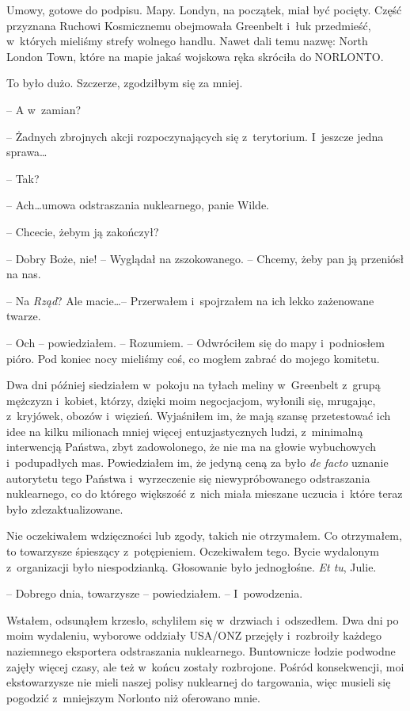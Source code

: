 \documentclass[oneside,polish,11pt,sfheadings]{mwbk}
\begin{document}
Umowy, gotowe do podpisu. Mapy. Londyn, na początek, miał być pocięty.
Część przyznana Ruchowi Kosmicznemu obejmowała Greenbelt i~łuk
przedmieść, w~których mieliśmy strefy wolnego handlu. Nawet dali temu
nazwę: North London Town, które na mapie jakaś wojskowa ręka skróciła do
NORLONTO.

To było dużo. Szczerze, zgodziłbym się za mniej.

-- A w~zamian?

-- Żadnych zbrojnych akcji rozpoczynających się z~terytorium. I~jeszcze
jedna sprawa\ldots

-- Tak?

-- Ach\ldots umowa odstraszania nuklearnego, panie Wilde.

-- Chcecie, żebym ją zakończył?

-- Dobry Boże, nie! -- Wyglądał na zszokowanego. -- Chcemy, żeby pan ją
przeniósł na nas.

-- Na \emph{Rząd}? Ale macie\ldots -- Przerwałem i~spojrzałem na ich lekko
zażenowane twarze.

-- Och -- powiedziałem. -- Rozumiem. -- Odwróciłem się do mapy i~podniosłem
pióro. Pod koniec nocy mieliśmy coś, co mogłem zabrać do mojego
komitetu.

Dwa dni później siedziałem w~pokoju na tyłach meliny w~Greenbelt z~grupą
mężczyzn i~kobiet, którzy, dzięki moim negocjacjom, wyłonili się,
mrugając, z~kryjówek, obozów i~więzień. Wyjaśniłem im, że mają szansę
przetestować ich idee na kilku milionach mniej więcej entuzjastycznych
ludzi, z~minimalną interwencją Państwa, zbyt zadowolonego, że nie ma na
głowie wybuchowych i~podupadłych mas. Powiedziałem im, że jedyną ceną za
było \emph{de facto} uznanie autorytetu tego Państwa i~wyrzeczenie się
niewypróbowanego odstraszania nuklearnego, co do którego większość z~nich miała mieszane uczucia i~które teraz było zdezaktualizowane.

Nie oczekiwałem wdzięczności lub zgody, takich nie otrzymałem. Co
otrzymałem, to towarzysze śpieszący z~potępieniem. Oczekiwałem tego.
Bycie wydalonym z~organizacji było niespodzianką. Głosowanie było
jednogłośne. \emph{Et tu}, Julie.

-- Dobrego dnia, towarzysze -- powiedziałem. -- I~powodzenia.

Wstałem, odsunąłem krzesło, schyliłem się w~drzwiach i~odszedłem. Dwa
dni po moim wydaleniu, wyborowe oddziały USA/ONZ przejęły i~rozbroiły
każdego naziemnego eksportera odstraszania nuklearnego. Buntownicze
łodzie podwodne zajęły więcej czasy, ale też w~końcu zostały rozbrojone.
Pośród konsekwencji, moi ekstowarzysze nie mieli naszej polisy
nuklearnej do targowania, więc musieli się pogodzić z~mniejszym Norlonto
niż oferowano mnie.
\end{document}

